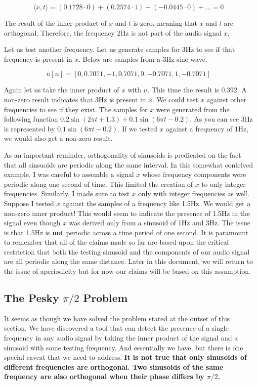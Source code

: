 $$\langle x, t \rangle = (0.1728 \cdot 0) + (0.2574 \cdot 1) + (-0.0445 \cdot 0) + ... = 0$$

\noindent The result of the inner product of $x$ and $t$ is zero, meaning that $x$ and $t$ are orthogonal.  Therefore,
the frequency 2Hz is not part of the audio signal $x$.  

Let us test another frequency.  Let us generate samples for 3Hz to see if that frequency is present in $x$.  
Below are samples from a 3Hz sine wave.

$$u[n] = [0, 0.7071, -1, 0.7071, 0, -0.7071, 1, -0.7071]$$

\noindent Again let us take the inner product of $x$ with $u$.  This time the result is 0.392.  A non-zero
result indicates that 3Hz is present in $x$.  We could test $x$ against other frequencies to see if they exist.  
The samples for $x$ were generated from the following function $0.2\sin(2\pi t + 1.3) + 0.1\sin(6\pi t -0.2)$.
As you can see 3Hz is represented by $0.1\sin(6\pi t -0.2)$.  If we tested $x$ against a frequency of 1Hz, we
would also get a non-zero result.

As an important reminder, orthogonality of sinusoids is predicated on the fact that all sinsuoids are periodic
along the same interval.  In this somewhat contrived example, I was careful to assemble a signal $x$ whose
frequency components were periodic along one second of time.  This limited the creation of $x$ to only
integer frequencies.  Similarly, I made sure to test $x$ only with integer frequencies as well.  Suppose I tested
$x$ against the samples of a frequency like 1.5Hz.  We would get a non-zero inner product!  This would seem
to indicate the presence of 1.5Hz in the signal even though $x$ was derived only from a sinusoid of 1Hz
and 3Hz.  The issue is that 1.5Hz is \textbf{not} periodic across a time period of one second.  It is paramount
to remember that all of the claims made so far are based upon the critical restriction that both the testing sinusoid
and the components of our audio signal are all periodic along the same distance.  Later in this document,
we will return to the issue of aperiodicity but for now our claims will be based on this assumption.

\subsection*{The Pesky $\pi/2$ Problem}

It seems as though we have solved the problem stated at the outset of this section.  We have discovered a tool
that can detect the presence of a single frequency in any audio signal by taking the inner product of the signal
and a sinusoid with some testing frequency.  And essentially we have, but there is one special caveat that
we need to address.  \textbf{It is not true that only sinusoids of different frequencies are orthogonal.  Two sinusoids of the same frequency are also orthogonal when their phase differs by $\pi/2$.}  

